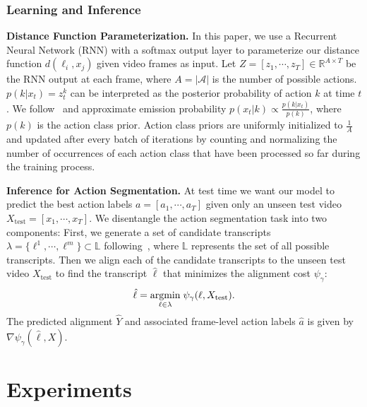 \documentclass[10pt,twocolumn,letterpaper]{article}
\begin{document}
\subsubsection{Learning and Inference}
\label{sec:method_learning_inference}
\vspace{1mm}
\noindent\textbf{Distance Function Parameterization.} 
In this paper, we use a Recurrent Neural Network (RNN) with a softmax output layer to parameterize our distance function $d(\ell_i, x_j)$ given video frames as input. Let $Z = [z_1, \cdots, z_T] \in \mathbb{R}^{A \times T}$ be the RNN output at each frame, where $A = |\mathcal{A}|$ is the number of possible actions. $p(k|x_t) = z_t^k$ can be interpreted as the posterior probability of action $k$ at time $t$. We follow~\cite{richard2018neuralnetwork} and approximate emission probability $p(x_t|k) \propto \frac{p(k|x_t) }{p(k)}$, where $p(k)$ is the action class prior. Action class priors are uniformly initialized to $\frac{1}{A}$ and updated after every batch of iterations by counting and normalizing the number of occurrences of each action class that have been processed so far during the training process.

\vspace{1mm}
\noindent\textbf{Inference for Action Segmentation.} 
At test time we want our model to predict the best action labels $a = [a_1, \cdots, a_T]$ given only an unseen test video $X_\mathrm{test} = [x_1, \cdots, x_T]$. We disentangle the action segmentation task into two components: First, we generate a set of candidate transcripts $\lambda = \{\ell^1, \cdots, \ell^m\} \subset \mathbb{L}$ following~\cite{richard2018neuralnetwork}, where $\mathbb{L}$ represents the set of all possible transcripts. 
Then we align each of the candidate transcripts to the unseen test video $X_\mathrm{test}$ to find the transcript $\hat \ell$ that minimizes the alignment cost $\psi_\gamma$:
\begin{equation}
\vspace{-1mm}
\label{eq:testtime}
\small
\hat \ell = \underset{\ell \in \lambda}{\mathrm{argmin}} \; \psi_\gamma (\ell, X_{\mathrm{test}}).
\end{equation}
The predicted alignment $\hat Y$ and associated frame-level action labels $\hat a$ is given by $\nabla \psi_\gamma (\hat \ell, X)$.

 \section{Experiments}
\label{sec:experiments}
\end{document}
